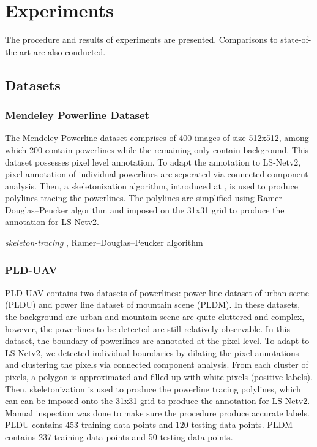 \documentclass[journal]{IEEEtran}
\begin{document}
\section{Experiments}
The procedure and results of experiments are presented. Comparisons to state-of-the-art are also conducted.
\subsection{Datasets}
\subsubsection{ Mendeley Powerline Dataset}
The Mendeley Powerline dataset comprises of 400 images of size 512x512, among which 200 contain powerlines while the remaining only contain background. This dataset possesses pixel level annotation. To adapt the annotation to LS-Netv2, pixel annotation of individual powerlines are seperated via connected component analysis. Then, a skeletonization algorithm, introduced at \cite{skeleton}, is used to produce polylines tracing the powerlines. The polylines are simplified using Ramer–Douglas–Peucker algorithm \cite{RDP} and imposed on the 31x31 grid to produce the annotation for LS-Netv2.

\emph{skeleton-tracing} \cite{skeleton}, Ramer–Douglas–Peucker algorithm \cite{RDP}
\subsubsection{PLD-UAV}

PLD-UAV \cite{PLD_UAV} contains two datasets of powerlines: power line dataset of urban scene (PLDU) and power line dataset of mountain scene (PLDM). In these datasets, the background are urban and mountain scene are quite cluttered and complex, however, the powerlines to be detected are still relatively observable. In this dataset, the boundary of powerlines are annotated at the pixel level. To adapt to LS-Netv2, we detected individual boundaries by dilating the pixel annotations and clustering the pixels via connected component analysis. From each cluster of pixels, a polygon is approximated and filled up with white pixels (positive labels). Then, skeletonization is used to produce the powerline tracing polylines, which can can be imposed onto the 31x31 grid to produce the annotation for LS-Netv2. Manual inspection was done to make sure the procedure produce accurate labels. PLDU contains 453 training data points and 120 testing data points. PLDM contains 237 training data points and 50 testing data points.
\end{document}
